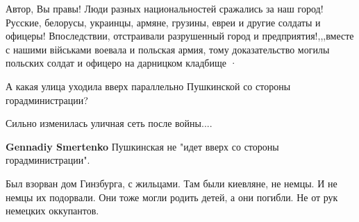 \begin{itemize}
Автор, Вы правы! Люди разных национальностей сражались за наш город! Русские,
белорусы, украинцы, армяне, грузины, евреи и другие солдаты и офицеры!
Впоследствии, отстраивали разрушенный город и предприятия!,,,вместе с нашими
військами воевала и польская армия, тому доказательство могилы польских солдат
и офицеро на дарницком кладбище · 


 

А какая улица уходила вверх параллельно Пушкинской со стороны горадминистрации?

Сильно изменилась уличная сеть после войны....

\begin{itemize}
 
\textbf{Gennadiy Smertenko} Пушкинская не "идет вверх со стороны горадминистрации".
\end{itemize}

 

Был взорван дом Гинзбурга, с жильцами. Там были киевляне, не немцы. И не немцы
их подорвали. Они тоже могли родить детей, а они погибли. Не от рук немецких
оккупантов.
\end{itemize}

